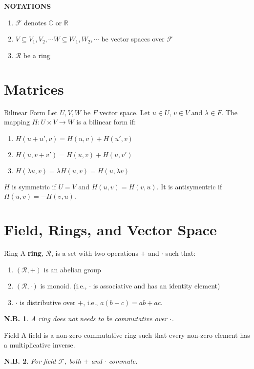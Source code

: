 \documentclass[12pt, a4paper]{article}
\newtheorem{note}{N.B.}[section]
\theoremstyle{remark}
\newcommand{\bb}[1]{\mathbb{#1}}
\newcommand{\mc}[1]{\mathcal{#1}}
\begin{document}
\textbf{NOTATIONS}
\begin{enumerate}
	\item $\mathcal{F}$ denotes $\bb{C}$ or $\bb{R}$
	\item $V \subseteq V_1, V_2, \cdots W \subseteq W_1, W_2, \cdots $ be vector spaces over $\mathcal{F}$
	\item $\mathcal{R}$ be a ring
\end{enumerate}

\section{Matrices}

\begin{definition}{Bilinear Form}{}
	Let $U, V, W$ be $F$ vector space. Let $u\in U$, $v \in V$ and $\lambda \in F$. The mapping $H: U \times V \rightarrow W$ is a bilinear form if: 
	\begin{enumerate}
		\item $H(u + u', v) = H(u, v) + H(u', v)$
		\item $H(u, v + v') = H(u, v) + H(u, v')$
		\item $H(\lambda u, v) = \lambda H(u, v) = H(u, \lambda v)$
	\end{enumerate}
	$H$ is symmetric if $U = V$ and $H(u, v) = H(v, u)$. It is antisymentric if $H(u, v) = -H(v, u)$.
\end{definition}
\section{Field, Rings, and Vector Space}
\begin{definition}{Ring}{}
	A \textbf{ring}, $\mathcal{R}$, is a set with two operations $+$ and $\cdot$ such that: 
	\begin{enumerate}
		\item $(\mathcal{R}, +)$ is an abelian group
		\item $(\mc{R},\cdot)$ is monoid. (i.e., $\cdot$ is associative and has an identity element) 
		\item $\cdot$ is distributive over $+$, i.e., $a(b+c) = ab + ac$.
	\end{enumerate}
\end{definition}
\begin{note}
	A ring does not needs to be commutative over $\cdot$. 
\end{note}

\begin{definition}{Field}{}
	A field is a non-zero commutative ring such that every non-zero element has a multiplicative inverse.
\end{definition}
\begin{note}
	For field $\mc{F}$, both $+$ and $\cdot$ commute. 
\end{note}
\end{document}
